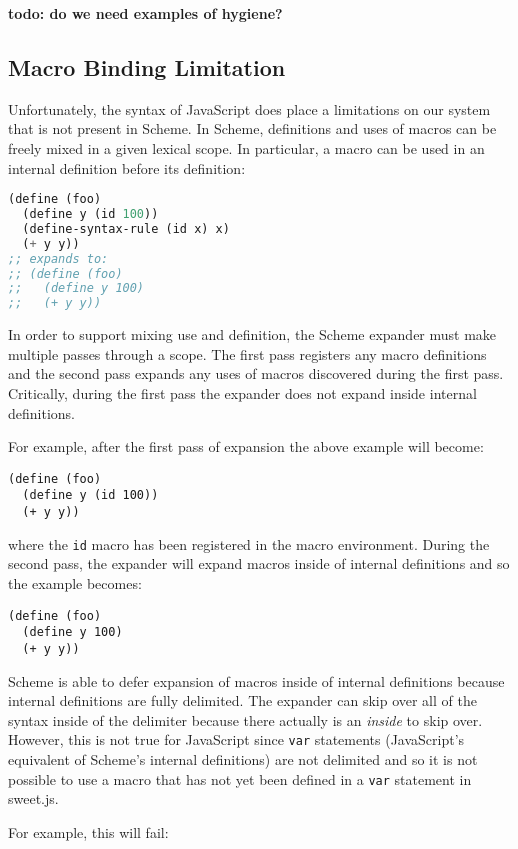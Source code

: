\documentclass[preprint,10pt]{sigplanconf}
\begin{document}
\textbf{todo: do we need examples of hygiene?}

\subsection{Macro Binding Limitation} 
\label{sec:macroBinding}

Unfortunately, the syntax of JavaScript does place a limitations on
our system that is not present in Scheme. In Scheme, definitions and
uses of macros can be freely mixed in a given lexical scope. In
particular, a macro can be used in an internal definition before its definition:

\begin{lstlisting}[language=lisp]
(define (foo)
  (define y (id 100))
  (define-syntax-rule (id x) x)
  (+ y y))
;; expands to:
;; (define (foo)
;;   (define y 100)
;;   (+ y y))
\end{lstlisting}

In order to support mixing use and definition, the Scheme expander
must make multiple passes through a scope. The first pass registers
any macro definitions and the second pass expands any uses of macros
discovered during the first pass. Critically, during the first
pass the expander does not expand inside internal definitions.

For example, after the first pass of expansion the above example will become:
\begin{lstlisting}
(define (foo)
  (define y (id 100))
  (+ y y))
\end{lstlisting}
where the \verb!id! macro has been registered in the macro
environment. During the second pass, the expander will expand macros
inside of internal definitions and so the example becomes:
\begin{lstlisting}
(define (foo)
  (define y 100)
  (+ y y))
\end{lstlisting}

Scheme is able to defer expansion of macros inside of internal
definitions because internal definitions are fully delimited. The
expander can skip over all of the syntax inside of the delimiter
because there actually is an \emph{inside} to skip over. However, this
is not true for JavaScript since \verb!var! statements
(JavaScript's equivalent of Scheme's internal definitions) are not
delimited and so it is not possible to use a macro that has not yet
been defined in a \verb!var! statement in sweet.js.

For example, this will fail:
\end{document}
